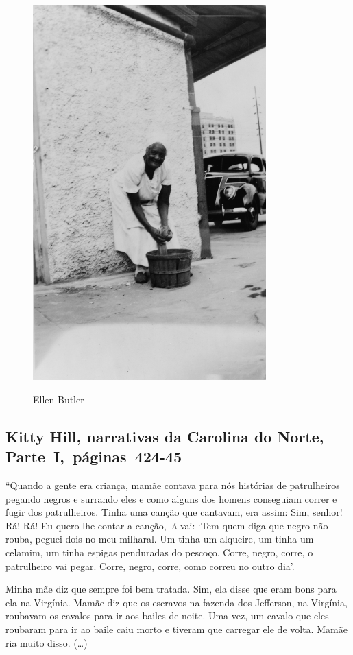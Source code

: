 \pagebreak
\thispagestyle{empty}
\begin{figure}[!ht]
\centering
 \includegraphics[width=90mm]{./imgs/ellenbutler_recorte.jpg} \label{img18}
\caption{Ellen Butler}
\end{figure}

\subsection{Kitty Hill, narrativas da Carolina do Norte, Parte~I,~páginas~424-45}
\label{ref146}

``Quando a gente era criança, mamãe contava para nós histórias de
patrulheiros pegando negros e surrando eles e como alguns dos homens
conseguiam correr e fugir dos patrulheiros. Tinha uma canção que
cantavam, era assim: Sim, senhor! Rá! Rá! Eu quero lhe contar a canção,
lá vai: `Tem quem diga que negro não rouba, peguei dois no meu milharal.
Um tinha um alqueire, um tinha um celamim, um tinha espigas penduradas
do pescoço. Corre, negro, corre, o patrulheiro vai pegar. Corre, negro,
corre, como correu no outro dia'.

Minha mãe diz que sempre foi bem tratada. Sim, ela disse que eram bons
para ela na Virgínia. Mamãe diz que os escravos na fazenda dos
Jefferson, na Virgínia, roubavam os cavalos para ir aos bailes de noite.
Uma vez, um cavalo que eles roubaram para ir ao baile caiu morto e
tiveram que carregar ele de volta. Mamãe ria muito disso. (\ldots{})

